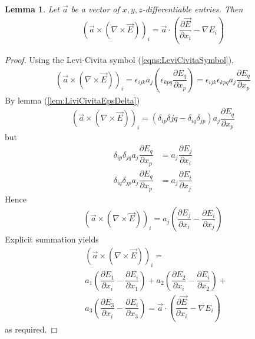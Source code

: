 \documentclass[twocolumn,secnumarabic,amssymb, nobibnotes, aps, prd]{revtex4-1}
\newtheorem{lem}{Lemma}[subsubsection]
\newtheorem{proof}{Proof}[subsubsection]
\begin{document}
\begin{lem}
Let $\overrightarrow{a}$ be a vector of $x,y,z$-differentiable entries. Then 
\begin{align}
\label{eqns:doubleCrossProdDecomposition}
\left( \overrightarrow{a} \times (\nabla \times \overrightarrow{E}) \right)_i = \overrightarrow{a} \cdot \left( \dfrac{\partial \overrightarrow{E}}{\partial x_i}- \nabla E_i \right)
\end{align}
\end{lem}

\begin{proof}
Using the Levi-Civita symbol (\ref{eqns:LeviCivitaSymbol}), 
\begin{align*}
\left( \overrightarrow{a} \times (\nabla \times \overrightarrow{E}) \right)_i  = \epsilon_{ijk}a_j\left( \epsilon_{kpq}\dfrac{\partial E_q}{\partial x_p} \right) = \epsilon_{ijk} \epsilon_{kpq} a_j \dfrac{\partial E_q}{\partial x_p}
\end{align*}
By lemma (\ref{lem:LiviCivitaEpsDelta})
\begin{align*}
\left( \overrightarrow{a} \times (\nabla \times \overrightarrow{E}) \right)_i  =  \left( \delta_{ip}\delta{jq} - \delta_{iq}\delta_{jp}\right) a_j \dfrac{\partial E_q}{\partial x_p}
\end{align*}
but
\begin{align*}
\delta_{ip}\delta_{jq}a_j \dfrac{\partial E_q}{\partial x_p} &= a_j \dfrac{\partial E_j}{\partial x_i} \\
\delta_{iq}\delta_{jp}a_j \dfrac{\partial E_q}{\partial x_p} &= a_j \dfrac{\partial E_i}{\partial x_j}
\end{align*}
Hence
\begin{align*}
\left( \overrightarrow{a} \times (\nabla \times \overrightarrow{E}) \right)_i = a_j\left( \dfrac{\partial E_j}{\partial x_i} - \dfrac{\partial E_i}{\partial x_j} \right)
\end{align*}
Explicit summation yields
\begin{equation*}
\begin{split}
&\left( \overrightarrow{a} \times (\nabla \times \overrightarrow{E}) \right)_i = \\
& a_1\left( \dfrac{\partial E_1}{\partial x_i} - \dfrac{\partial E_i}{\partial x_1} \right) + 
a_2\left( \dfrac{\partial E_2}{\partial x_i} - \dfrac{\partial E_i}{\partial x_2} \right) +\\
& a_3\left( \dfrac{\partial E_3}{\partial x_i} - \dfrac{\partial E_i}{\partial x_3} \right) =
\overrightarrow{a} \cdot \left( \dfrac{\partial \overrightarrow{E}}{\partial x_i}- \nabla E_i \right)
\end{split}
\end{equation*}
as required.
\end{proof}
\end{document}
